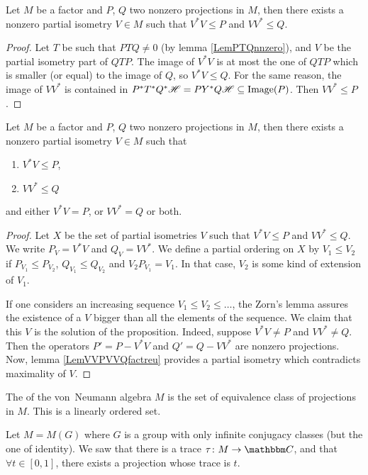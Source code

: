 \begin{lemma}		\label{LemVVPVVQfactreu}
Let $M$ be a factor and $P$, $Q$ two nonzero projections in $M$, then there exists a nonzero partial isometry $V\in M$ such that $V^*V\leq P$ and $VV^*\leq Q$.
\end{lemma}

\begin{proof}
Let $T$ be such that $PTQ\neq 0$ (by lemma \ref{LemPTQnnzero}), and $V$ be the partial isometry part of $QTP$. The image of $V^*V$ is at most the one of $QTP$ which is smaller (or equal) to the image of $Q$, so $V^*V\leq Q$. For the same reason, the image of $VV^*$ is contained in $P^*T^*Q^*\mathscr{H}=PY^*Q\mathscr{H}\subseteq\operatorname{Image}(P)$. Then $VV^*\leq P$.
\end{proof}

\begin{proposition}
Let $M$ be a factor and $P$, $Q$ two nonzero projections in $M$, then there exists a nonzero partial isometry $V\in M$ such that 
\begin{enumerate}
\item $V^*V\leq P$,
\item $VV^*\leq Q$
\end{enumerate}
and either $V^*V=P$, or $VV^*=Q$ or both.
\end{proposition}

\begin{proof}
Let $X$ be the set of partial isometries $V$ such that $V^*V\leq P$ and $VV^*\leq Q$. We write $P_V=V^*V$ and $Q_V=VV^*$. We define a partial ordering on $X$ by $V_1\leq V_2$ if $P_{V_1}\leq P_{V_2}$, $Q_{V_1}\leq Q_{V_2}$ and $V_2P_{V_1}=V_1$. In that case, $V_2$ is some kind of extension of $V_1$.

If one considers an increasing sequence $V_1\leq V_2\leq\ldots$, the Zorn's lemma assures the existence of a $V$ bigger than all the elements of the sequence. We claim that this $V$ is the solution of the proposition. Indeed, suppose $V^*V\neq P$ and $VV^*\neq Q$. Then the operators $P'=P-V^*V$ and $Q'=Q-VV^*$ are nonzero projections. Now, lemma \ref{LemVVPVVQfactreu} provides a partial isometry which contradicts maximality of $V$.
\end{proof}

The  of the von~Neumann algebra $M$ is the set of equivalence class of projections in $M$. This is a linearly ordered set.

Let $M=M(G)$ where $G$ is a group with only infinite conjugacy classes (but the one of identity). We saw that there is a trace $\tau\colon M\to \eC$, and that $\forall t\in[0,1]$, there exists a projection whose trace is $t$.

